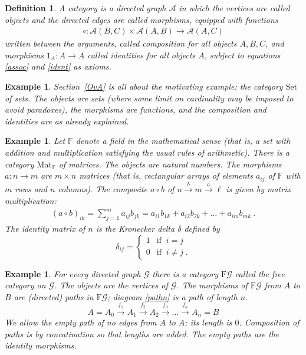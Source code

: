 \documentclass[a4paper,12pt]{article}
\newtheorem{definition}[theorem]{Definition}
\newtheorem{example}[theorem]{Example}
\theoremstyle{step}
\newcommand{\lra}{\longrightarrow}
\newcommand{\xra}{\xrightarrow}
\def\CA{{\mathscr A}}
\def\CG{{\mathscr G}}
\begin{document}
\begin{definition}\label{categorydef} A {\em category} is a directed graph $\CA$ in which the vertices are called {\em objects}
and the directed edges are called {\em morphisms}, equipped with functions
\begin{eqnarray}\label{compo}
\circ : \CA(B,C) \times \CA(A,B) \lra \CA(A,C)
\end{eqnarray}
written between the arguments, called {\em composition} for all objects $A, B, C$, and morphisms $1_A : A\to A$ called {\em identities}
for all objects $A$, subject to equations \eqref{assoc} and \eqref{ident} as axioms.    
\end{definition}

\begin{example}
Section~\ref{OvA} is all about the motivating example: the category $\mathrm{Set}$ of sets.
The objects are sets (where some limit on cardinality may be imposed to avoid paradoxes), the morphisms are functions, and the composition and identities are as already explained.
\end{example}

\begin{example}\label{Matex}
Let $\mathbb{F}$ denote a field in the mathematical sense (that is, a set with addition and multiplication
satisfying the usual rules of arithmetic). There is a category $\mathrm{Mat}_\mathbb{F}$ of {\em matrices}.
The objects are natural numbers. The morphisms $a : n\to m$ are $m\times n$ matrices (that is,
rectangular arrays of elements $a_{ij}$ of $\mathbb{F}$ with $m$ rows and $n$ columns). The composite $a\circ b$ of $n\xra{b} m\xra{a} \ell$ is given by matrix multiplication:
\begin{eqnarray*}
(a\circ b)_{ik} = \sum_{j=1}^{m} a_{ij}b_{jk} = a_{i1}b_{1k} + a_{i2}b_{2k}+ \dots + a_{im}b_{mk} \ .
\end{eqnarray*} 
 The identity matrix of $n$ is the {\em Kronecker delta} $\delta$ defined by
\begin{equation*}
\delta_{ij} =
\begin{cases}
1 & \text{if } \ i=j  \\
0 & \text{if } \ i\neq j \ .
\end{cases}
\end{equation*}
\end{example}

\begin{example}\label{freecat}
For every directed graph $\CG$ there is a category $\mathrm{F}\CG$ called the {\em free category on} $\CG$. The objects are the vertices of $\CG$. The morphisms of $\mathrm{F}\CG$ from $A$ to $B$ are {\em (directed) paths} in $\mathrm{F}\CG$; diagram \eqref{pathn} is a path of length $n$.  
\begin{equation}\label{pathn}
A= A_0\xra{f_1} A_1 \xra{f_2} A_2\xra{f_3} \dots \xra{f_n} A_n= B
\end{equation}
We allow the {\em empty path} of no edges from $A$ to $A$; its length is $0$.
Composition of paths is by concatination so that lengths are added. The empty paths are the identity morphisms.
\end{example}
\end{document}
